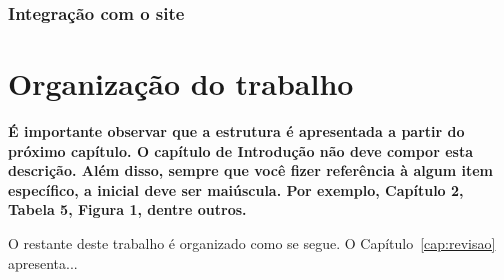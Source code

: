 \subsubsection{Integração com o site}

\section{Organização do trabalho}

\textbf{É importante observar que a estrutura é apresentada a partir do próximo capítulo. O capítulo de Introdução não deve compor esta descrição. Além disso, sempre que você fizer referência à algum item específico, a inicial deve ser maiúscula. Por exemplo, Capítulo 2, Tabela 5, Figura 1, dentre outros.}

O restante deste trabalho é organizado como se segue. O Capítulo~\ref{cap:revisao} apresenta...
